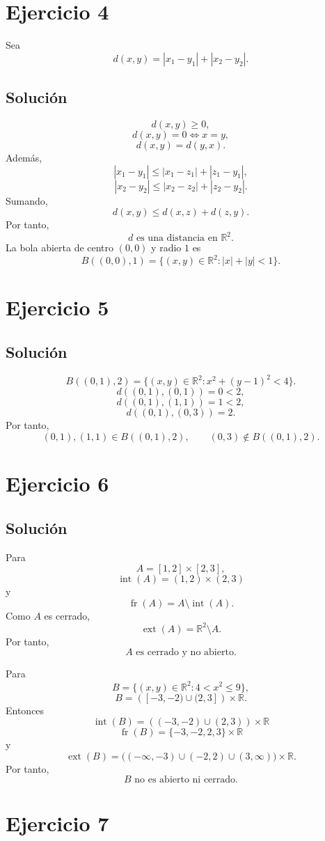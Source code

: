 \documentclass[11pt,a4paper]{article}
\newcommand{\R}{\mathbb{R}}
\newcommand{\Int}{\operatorname{int}}
\newcommand{\Ext}{\operatorname{ext}}
\newcommand{\Fr}{\operatorname{fr}}
\begin{document}
\section{Ejercicio 4}
Sea
\[
d(x,y)=|x_1-y_1|+|x_2-y_2|.
\]
\subsection{Solución}
\[
d(x,y)\geq0,
\]
\[
d(x,y)=0\iff x=y,
\]
\[
d(x,y)=d(y,x).
\]
Además,
\[
|x_1-y_1|\leq|x_1-z_1|+|z_1-y_1|,
\]
\[
|x_2-y_2|\leq|x_2-z_2|+|z_2-y_2|.
\]
Sumando,
\[
d(x,y)\leq d(x,z)+d(z,y).
\]
Por tanto,
\[
\boxed{d\text{ es una distancia en }\R^2}.
\]
La bola abierta de centro \((0,0)\) y radio \(1\) es
\[
\boxed{
B((0,0),1)=\{(x,y)\in\R^2:|x|+|y|<1\}.
}
\]

\section{Ejercicio 5}
\subsection{Solución}
\[
\boxed{
B((0,1),2)
=
\{(x,y)\in\R^2:x^2+(y-1)^2<4\}.
}
\]
\[
d((0,1),(0,1))=0<2,
\]
\[
d((0,1),(1,1))=1<2,
\]
\[
d((0,1),(0,3))=2.
\]
Por tanto,
\[
\boxed{
(0,1),(1,1)\in B((0,1),2),
\qquad
(0,3)\notin B((0,1),2).
}
\]

\section{Ejercicio 6}
\subsection{Solución}
Para
\[
A=[1,2]\times[2,3],
\]
\[
\boxed{\Int(A)=(1,2)\times(2,3)}
\]
y
\[
\boxed{\Fr(A)=A\setminus\Int(A)}.
\]
Como \(A\) es cerrado,
\[
\boxed{\Ext(A)=\R^2\setminus A}.
\]
Por tanto,
\[
\boxed{A\text{ es cerrado y no abierto}.}
\]

Para
\[
B=\{(x,y)\in\R^2:4<x^2\leq9\},
\]
\[
B=\left([-3,-2)\cup(2,3]\right)\times\R.
\]
Entonces
\[
\boxed{
\Int(B)=\left((-3,-2)\cup(2,3)\right)\times\R
}
\]
\[
\boxed{
\Fr(B)=\{-3,-2,2,3\}\times\R
}
\]
y
\[
\boxed{
\Ext(B)=
\bigl((-\infty,-3)\cup(-2,2)\cup(3,\infty)\bigr)\times\R.
}
\]
Por tanto,
\[
\boxed{B\text{ no es abierto ni cerrado}.}
\]

\section{Ejercicio 7}
\end{document}
